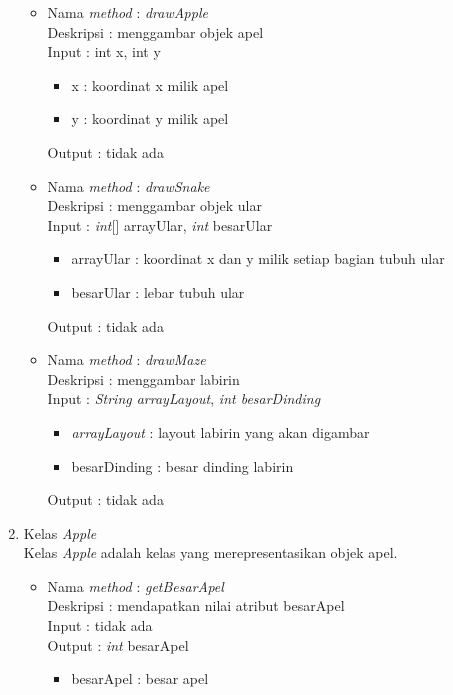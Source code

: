 \begin{enumerate}
		\begin{itemize}
			\item Nama \textit{method} : \textit{drawApple}\\
				  Deskripsi : menggambar objek apel\\
				  Input : int x, int y
				  	\begin{itemize}
				  		\item x : koordinat x milik apel
				  		\item y : koordinat y milik apel
				  	\end{itemize}
				  Output : tidak ada\\
				  
			\item Nama \textit{method} : \textit{drawSnake}\\
				  Deskripsi : menggambar objek ular\\
				  Input : \textit{int}[] arrayUlar, \textit{int} besarUlar
				  	\begin{itemize}
				  		\item arrayUlar : koordinat x dan y milik setiap bagian tubuh ular
				  		\item besarUlar : lebar tubuh ular
				  	\end{itemize}
				  Output : tidak ada\\
				  
			\item Nama \textit{method} : \textit{drawMaze}\\
				  Deskripsi : menggambar labirin\\
				  Input : \textit{String arrayLayout}, \textit{int besarDinding}
				  	\begin{itemize}
				  		\item \textit{arrayLayout} : layout labirin yang akan digambar
				  		\item besarDinding : besar dinding labirin
				  	\end{itemize}
				  Output : tidak ada\\
		\end{itemize}
		
	\item Kelas \textit{Apple}\\
	Kelas \textit{Apple} adalah kelas yang merepresentasikan objek apel.
	
		\begin{itemize}
			\item Nama \textit{method} : \textit{getBesarApel}\\
				  Deskripsi : mendapatkan nilai atribut besarApel\\
				  Input : tidak ada\\
				  Output : \textit{int} besarApel
				  	\begin{itemize}
				  		\item besarApel : besar apel
				  	\end{itemize}
		\end{itemize}
		

\end{enumerate}
